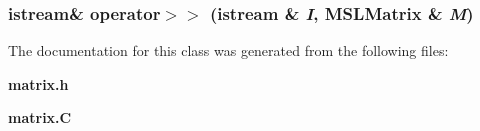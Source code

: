 \subsubsection{\setlength{\rightskip}{0pt plus 5cm}istream\& operator$>$$>$ (istream \& {\em I}, MSLMatrix \& {\em M})\hspace{0.3cm}{\tt  [friend]}}\label{classMSLMatrix_l1}




The documentation for this class was generated from the following files:\begin{CompactItemize}
\item 
{\bf matrix.h}\item 
{\bf matrix.C}\end{CompactItemize}
